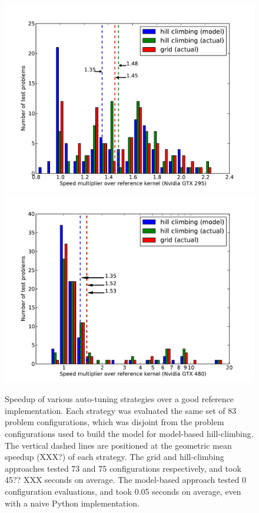 \documentclass{sig-alternate}
\begin{document}
\begin{figure}
\centering
\includegraphics[scale=.42]{speedup_295.pdf}
\includegraphics[scale=.42]{speedup_480.pdf}
\caption{Speedup of various auto-tuning strategies over a good reference
implementation.
Each strategy was evaluated the same set of 83 problem configurations, which
was disjoint from the problem configurations used to build the model for
model-based hill-climbing.
The vertical dashed lines are positioned at the geometric mean speedup (XXX?)
of each strategy. The grid and hill-climbing approaches
tested 73 and 75 configurations respectively, and took 45?? XXX
seconds on average.
The model-based approach tested 0 configuration evaluations, and took 0.05
seconds on average, even with a naive Python implementation.
}
\label{fig:speedup}
\end{figure}
\end{document}
